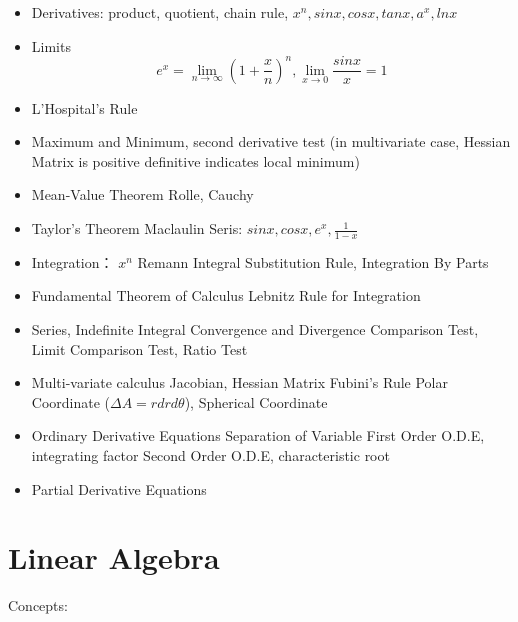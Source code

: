 \documentclass[11pt, openany]{book}              %
\begin{document}
\begin{itemize}
    \item Derivatives: product, quotient, chain rule, $x^n, sinx, cosx, tanx, a^x, lnx$ 
    \item Limits $$e^x = \lim_{n\to \infty}(1+\frac{x}{n})^n, \lim_{x\to 0} \frac{sinx}{x} = 1$$
    \item L'Hospital's Rule
    \item Maximum and Minimum, second derivative test (in multivariate case, Hessian Matrix is positive definitive indicates local minimum)
    \item Mean-Value Theorem
    	\subitem Rolle, Cauchy 
    \item Taylor's Theorem
    	\subitem Maclaulin Seris: $sinx, cosx, e^x, \frac{1}{1-x}$
    \item Integration： $x^n$
         \subitem Remann Integral
    	\subitem Substitution Rule, Integration By Parts
    \item Fundamental Theorem of Calculus
    	\subitem Lebnitz Rule for Integration
    \item Series, Indefinite Integral
    	\subitem Convergence and Divergence
    	\subitem Comparison Test, Limit Comparison Test, Ratio Test
    \item Multi-variate calculus
    	\subitem Jacobian, Hessian Matrix
    	\subitem Fubini's Rule
    	\subitem Polar Coordinate ($\Delta A = rdrd\theta$), Spherical Coordinate
    \item Ordinary Derivative Equations
    	\subitem Separation of Variable
    	\subitem First Order O.D.E, integrating factor
    	\subitem Second Order O.D.E, characteristic root
    \item Partial Derivative Equations
\end{itemize}



\section{Linear Algebra}

Concepts:
\end{document}
